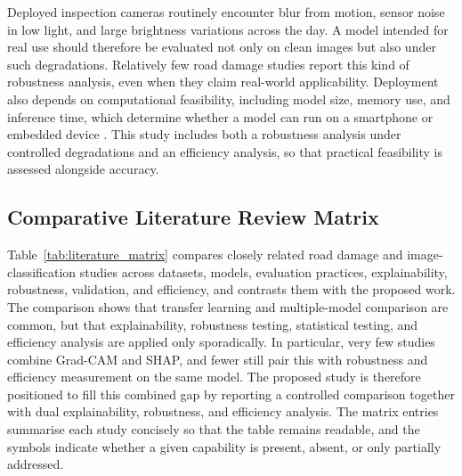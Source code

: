 \documentclass[preprint,12pt]{elsarticle}
\begin{document}
Deployed inspection cameras routinely encounter blur from motion, sensor noise in low light, and large brightness variations across the day.
A model intended for real use should therefore be evaluated not only on clean images but also under such degradations.
Relatively few road damage studies report this kind of robustness analysis, even when they claim real-world applicability.
Deployment also depends on computational feasibility, including model size, memory use, and inference time, which determine whether a model can run on a smartphone or embedded device \cite{sandler2018mobilenetv2}.
This study includes both a robustness analysis under controlled degradations and an efficiency analysis, so that practical feasibility is assessed alongside accuracy.

\subsection{Comparative Literature Review Matrix}

Table~\ref{tab:literature_matrix} compares closely related road damage and image-classification studies across datasets, models, evaluation practices, explainability, robustness, validation, and efficiency, and contrasts them with the proposed work.
The comparison shows that transfer learning and multiple-model comparison are common, but that explainability, robustness testing, statistical testing, and efficiency analysis are applied only sporadically.
In particular, very few studies combine Grad-CAM and SHAP, and fewer still pair this with robustness and efficiency measurement on the same model.
The proposed study is therefore positioned to fill this combined gap by reporting a controlled comparison together with dual explainability, robustness, and efficiency analysis.
The matrix entries summarise each study concisely so that the table remains readable, and the symbols indicate whether a given capability is present, absent, or only partially addressed.
\end{document}
